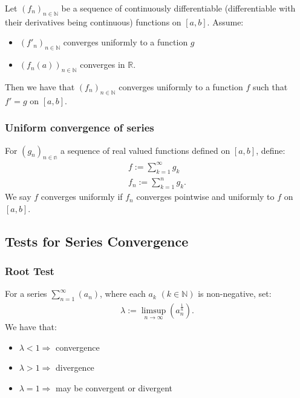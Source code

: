 \documentclass[a4paper, 12pt, twoside]{article}
\begin{document}
Let $(f_n)_{n\in\mathbb{N}}$ be a sequence of continuously differentiable
(differentiable with their derivatives being continuous) functions on $[a, b]$.
Assume:

\begin{itemize}
      \item $(f'_n)_{n\in\mathbb{N}}$ converges uniformly to a function $g$
      \item $(f_n(a))_{n\in\mathbb{N}}$ converges in $\mathbb{R}$.
\end{itemize}

Then we have that $(f_n)_{n\in\mathbb{N}}$ converges uniformly to a function
$f$ such that $f' = g$ on $[a, b]$.

\subsubsection{Uniform convergence of series}

For $(g_n)_{n\in\mathbb{n}}$ a sequence of real valued functions defined on
$[a, b]$, define:
\begin{align}
      f := \sum_{k = 1}^\infty g_k \\
      f_n := \sum_{k = 1}^n g_k.
\end{align}
We say $f$ converges uniformly if $f_n$ converges pointwise and uniformly to
$f$ on $[a, b]$.

\subsection{Tests for Series Convergence}

\subsubsection{Root Test}

For a series $\sum_{n = 1}^\infty(a_n)$, where each $a_k$ $(k\in\mathbb{N})$
is non-negative, set:
\begin{align*}
      \lambda := \limsup_{n\to\infty}(a_n^{\frac{1}{n}}).
\end{align*}
We have that:

\begin{itemize}
      \item $\lambda < 1 \Rightarrow$ convergence
      \item $\lambda > 1 \Rightarrow$ divergence
      \item $\lambda = 1 \Rightarrow$ may be convergent or divergent
\end{itemize}
\end{document}
